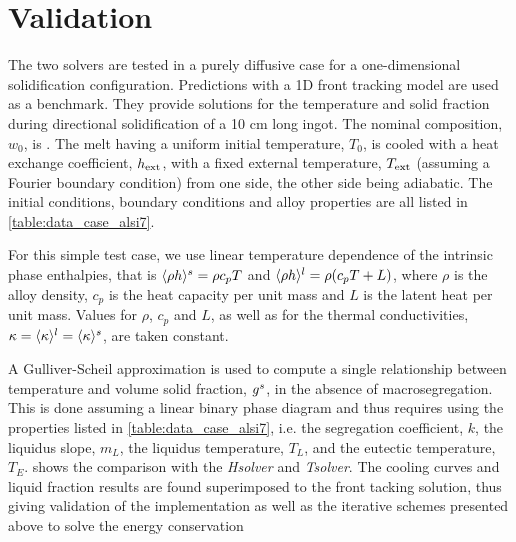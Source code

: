 \section{Validation}


The two solvers are tested in a purely diffusive case for a one-dimensional solidification configuration. 
Predictions with a 1D front tracking model \citep{gandin_constrained_2000} are used as a benchmark. They provide 
solutions for the temperature and solid fraction during directional solidification of a 10 cm long ingot. The nominal
composition, $w_0$, is . 
The melt having a uniform initial temperature, $T_0$, is cooled with a heat exchange coefficient, $h_{\text{ext}}$,
with a fixed external temperature, $T_{\text{ext}}$ (assuming a Fourier 
boundary condition) from one side, the other side being adiabatic. The initial conditions,
boundary conditions and alloy properties are all listed in \cref{table:data_case_alsi7}.

For this simple test case, 
we use linear temperature dependence of the intrinsic phase enthalpies, that is $\langle  \rho h  \rangle^s= \rho c_p T$ and $\langle  \rho h  \rangle^l= \rho (c_p T + L)$, 
where $\rho$ is the alloy density, $c_p$ is the heat capacity per unit mass and $L$ is the latent heat per unit mass. 
Values for $\rho$, $c_p$ and $L$, as well as for the thermal conductivities, $\kappa = \langle \kappa \rangle^l = \langle \kappa \rangle^s$, are taken constant. 

A Gulliver-Scheil approximation is used to compute a single relationship between temperature and volume solid fraction, ${g^s}$, in the 
absence of macrosegregation. This is done assuming a linear binary phase diagram and thus requires using the 
properties listed in \cref{table:data_case_alsi7}, i.e. the segregation coefficient, $k$, the liquidus slope, $m_L$, the 
liquidus temperature, $T_L$, and the eutectic temperature, $T_E$.  shows the comparison with 
the \emph{Hsolver} and \emph{Tsolver}. The cooling curves and liquid fraction results are found superimposed to the front tacking solution, 
thus giving validation of the implementation as well as the iterative schemes presented above to solve the energy conservation 

